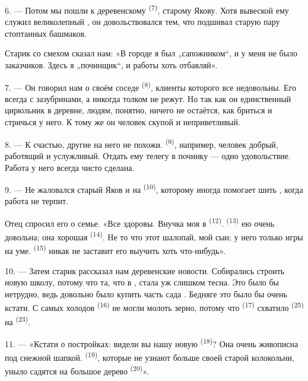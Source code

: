 6. --- Потом мы пошли к деревенскому  \textsuperscript{(7)},
старому Якову. Хотя вывеской ему служил великолепный , он
довольствовался тем, что подшивал старую пару стоптанных башмаков.

Старик со смехом сказал нам: «В городе я был „сапожником“, и у меня не
было заказчиков. Здесь я „починщик“, и работы хоть отбавляй».

7. --- Он говорил нам о своём соседе  \textsuperscript{(8)},
клиенты которого все недовольны. Его  всегда с зазубринами,
а  никогда толком не режут. Но так как он единственный
цирюльник в деревне, людям, понятно, ничего не остаётся, как бриться и
стричься у него. К тому же он человек скупой и неприветливый.

8. --- К счастью, другие  на него не похожи.
 \textsuperscript{(9)}, например, человек добрый, работящий и
услужливый. Отдать ему телегу в починку --- одно удовольствие. Работа у
него всегда чисто сделана.

9. --- Не жаловался старый Яков и на  \textsuperscript{(10)},
которому иногда помогает шить , когда работа не терпит.

Отец спросил его о семье. «Все здоровы. Внучка моя в 
\textsuperscript{(12)}.  \textsuperscript{(13)} ею очень довольна;
она хорошая  \textsuperscript{(14)}. Не то что этот шалопай, мой
сын; у него только игры на уме.  \textsuperscript{(15)} никак не
заставит его выучить хоть что-нибудь».

\VUsaut{3.0mm}
\VUsaut{3.0mm}

10. --- Затем старик рассказал нам деревенские новости. Собирались строить
новую школу, потому что та, что в , стала уж
слишком тесна. Это было бы нетрудно, ведь довольно было купить часть сада
. Бедняге это было бы очень кстати. С самых холодов
  \textsuperscript{(16)} не могли молоть зерно,
потому что  \textsuperscript{(17)} схватило 
\textsuperscript{(25)} на  \textsuperscript{(23)}.

11. --- «Кстати о постройках: видели вы нашу новую 
\textsuperscript{(18)}? Она очень живописна под снежной шапкой. 
\textsuperscript{(19)}, которые не узнают больше своей старой колокольни, уныло
садятся на большое дерево  \textsuperscript{(20)}».

